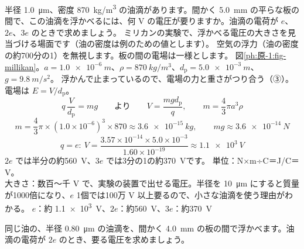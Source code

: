 \label{ph:原-1:ex4}
\begin{phreidai}[油滴を浮かべる電圧]
半径 \qty{1.0}{\micro m}、密度 \qty{870}{kg/m^3} の油滴があります。間かく \qty{5.0}{mm} の平らな板の間で、この油滴を浮かべるには、何 V の電圧が要りますか。油滴の電荷が $e$、$2e$、$3e$ のときで求めましょう。
\phbamen
ミリカンの実験で、浮かべる電圧の大きさを見当づける場面です（油の密度は例のための値とします）。
\phmushi
空気の浮力（油の密度の約700分の1）を無視します。板の間の電場は一様とします。
\phzu
図\ref{ph:原-1:fig-millikan}。$a=\qty{1.0e-6}{m}$、$\rho=\qty{870}{kg/m^3}$、$d_{\mathrm p}=\qty{5.0e-3}{m}$、$g=\qty{9.8}{m/s^2}$。
\phriyu
浮かんで止まっているので、電場の力と重さがつり合う（③）。電場は $E=V/d_{\mathrm p}$。
\phtateru
\[ q\,\frac{V}{d_{\mathrm p}}=mg\qquad\text{より}\qquad V=\frac{mgd_{\mathrm p}}{q},\qquad m=\frac43\pi a^3\rho \]
\phtoku
\[ m=\frac43\pi\times(1.0\times10^{-6})^3\times870\approx\qty{3.6e-15}{kg},\qquad mg\approx\qty{3.6e-14}{N} \]
\[ q=e:\ V=\frac{3.57\times10^{-14}\times5.0\times10^{-3}}{1.60\times10^{-19}}\approx\qty{1.1e3}{V} \]
$2e$ では半分の約\qty{560}{V}、$3e$ では3分の1の約\qty{370}{V}です。
\phtashikame
単位：N×m÷C＝J/C＝V。\\
大きさ：数百〜千 V で、実験の装置で出せる電圧。半径を \qty{10}{\micro m} にすると質量が1000倍になり、$e$ 1個では100万 V 以上要るので、小さな油滴を使う理由がわかる。
\kotae $e$：約 \qty{1.1e3}{V}、$2e$：約\qty{560}{V}、$3e$：約\qty{370}{V}
\end{phreidai}
\begin{jibun}
同じ油の、半径 \qty{0.80}{\micro m} の油滴を、間かく \qty{4.0}{mm} の板の間で浮かべます。油滴の電荷が $2e$ のとき、要る電圧を求めましょう。
\end{jibun}

